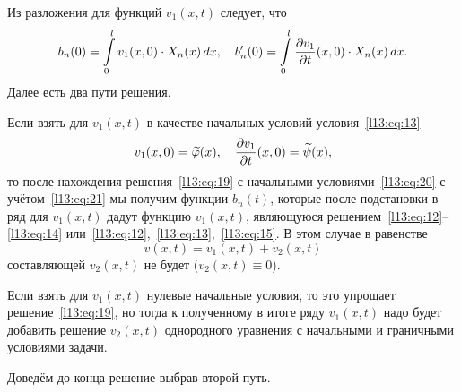 Из разложения для функций $v_1(x,t)$ следует, что
\begin{equation}\label{l13:eq:20}
	 b_n(0)=\int\limits_0^l v_1(x,0)\cdot X_n(x)\,dx,\quad b'_n(0)=\int\limits_0^l \frac{\partial v_1}{\partial t}(x,0)\cdot X_n(x)\,dx.
\end{equation}
Далее есть два пути решения.
\begin{enumerateD}
	\item Если взять для $v_1(x,t)$ в качестве начальных условий условия~\eqref{l13:eq:13}
	\begin{equation}\label{l13:eq:21}
		 v_1(x,0)=\widetilde{\varphi}(x),\quad\frac{\partial v_1}{\partial t}(x,0)=\widetilde{\psi}(x),
	\end{equation}
	то после нахождения решения~\eqref{l13:eq:19} с начальными условиями~\eqref{l13:eq:20} с учётом~\eqref{l13:eq:21} мы получим функции $b_n(t)$, которые после подстановки в ряд для $v_1(x,t)$ дадут функцию $v_1(x,t)$, являющуюся решением~\eqref{l13:eq:12}--\eqref{l13:eq:14} или~\eqref{l13:eq:12},~\eqref{l13:eq:13},~\eqref{l13:eq:15}. В этом случае в равенстве 
	\begin{equation*}
		 v(x,t)=v_1(x,t)+v_2(x,t)
	\end{equation*} 
	составляющей $v_2(x,t)$ не будет ($v_2(x,t)\equiv0$).
	\item Если взять для $v_1(x,t)$ нулевые начальные условия, то это упрощает решение~\eqref{l13:eq:19}, но тогда к полученному в итоге ряду $v_1(x,t)$ надо будет добавить решение $v_2(x,t)$ однородного уравнения с начальными и граничными условиями задачи.   
\end{enumerateD}

\noindent Доведём до конца решение выбрав второй путь.  

